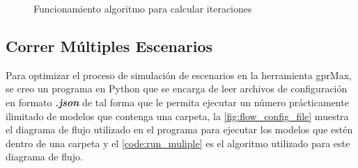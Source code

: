 \begin{figure}[H]   
\centering
{}

\caption{Funcionamiento algoritmo para calcular iteraciones}
\label{fig:calcularIteraciones}


\end{figure}





\newpage
\subsection{Correr Múltiples Escenarios}

Para optimizar el proceso de simulación de escenarios en la herramienta gprMax, se creo un programa en Python que se encarga de leer archivos de configuración en formato \textbf{\textit{.json}} de tal forma que le permita ejecutar un número prácticamente ilimitado de modelos que contenga una carpeta, la  \figurename{ \ref{fig:flow_config_file}} muestra el diagrama de flujo utilizado en el programa para ejecutar los modelos que estén dentro de una carpeta y el \lstlistingname{ \ref{code:run_muliple}} es el algoritmo utilizado para este diagrama de flujo.

